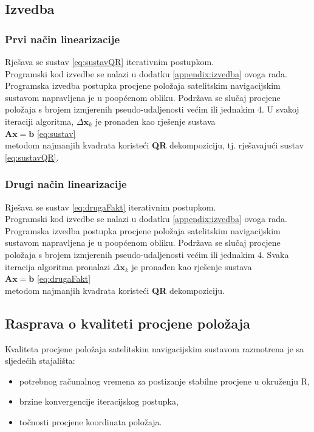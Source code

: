 \documentclass[a4paper,twoside,12pt]{memoir} %
\begin{document}
\subsection{Izvedba}
\subsubsection{Prvi način linearizacije}
Rješava se sustav \ref{eq:sustavQR} iterativnim postupkom.\\
Programski kod izvedbe se nalazi u dodatku \ref{appendix:izvedba} ovoga rada.\\
Programska izvedba postupka procjene položaja satelitskim navigacijskim sustavom napravljena je u poopćenom obliku. Podržava se slučaj procjene položaja s brojem izmjerenih pseudo-udaljenosti većim ili jednakim 4.
U svakoj iteraciji algoritma, $\Delta \mathbf{x}_k$ je pronađen kao rješenje sustava\\
$\mathbf{A}\mathbf{x} = \mathbf{b}$ \ref{eq:sustav}\\
metodom najmanjih kvadrata koristeći \textbf{QR} dekompoziciju, tj. rješavajući sustav \ref{eq:sustavQR}.

\subsubsection{Drugi način linearizacije}
Rješava se sustav \ref{eq:drugaFakt} iterativnim postupkom.\\
Programski kod izvedbe se nalazi u dodatku \ref{appendix:izvedba} ovoga rada.\\
Programska izvedba postupka procjene položaja satelitskim navigacijskim sustavom napravljena je u poopćenom obliku. Podržava se slučaj procjene položaja s brojem izmjerenih pseudo-udaljenosti većim ili jednakim 4.
Svaka iteracija algoritma pronalazi $\Delta \mathbf{x}_k$ je pronađen kao rješenje sustava\\
$\mathbf{A}\mathbf{x} = \mathbf{b}$ \ref{eq:drugaFakt}\\
metodom najmanjih kvadrata koristeći \textbf{QR} dekompoziciju.

\subsection{Rasprava o kvaliteti procjene položaja}
Kvaliteta procjene položaja satelitskim navigacijskim sustavom razmotrena je sa sljedećih stajališta:
\begin{itemize}
	\item potrebnog računalnog vremena za postizanje stabilne procjene u okruženju R,
	\item brzine konvergencije iteracijskog postupka,
	\item točnosti procjene koordinata položaja.
\end{itemize}
\end{document}
